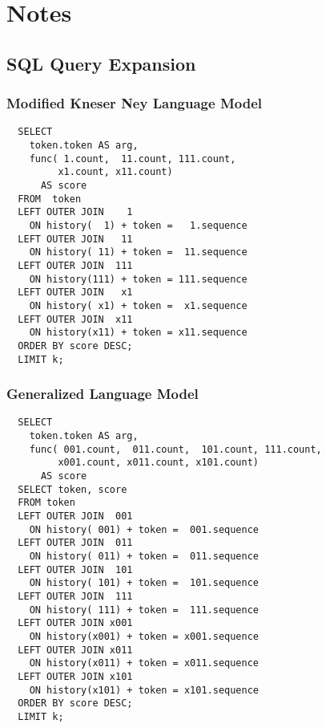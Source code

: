 \chapter{Notes}


\section{SQL Query Expansion}


\subsection{Modified Kneser Ney Language Model}

\begin{lstlisting}
  SELECT
    token.token AS arg,
    func( 1.count,  11.count, 111.count,
         x1.count, x11.count)
      AS score
  FROM  token
  LEFT OUTER JOIN    1
    ON history(  1) + token =   1.sequence
  LEFT OUTER JOIN   11
    ON history( 11) + token =  11.sequence
  LEFT OUTER JOIN  111
    ON history(111) + token = 111.sequence
  LEFT OUTER JOIN   x1
    ON history( x1) + token =  x1.sequence
  LEFT OUTER JOIN  x11
    ON history(x11) + token = x11.sequence
  ORDER BY score DESC;
  LIMIT k;
\end{lstlisting}

\clearpage
\subsection{Generalized Language Model}

\begin{lstlisting}
  SELECT
    token.token AS arg,
    func( 001.count,  011.count,  101.count, 111.count,
         x001.count, x011.count, x101.count)
      AS score
  SELECT token, score
  FROM token
  LEFT OUTER JOIN  001
    ON history( 001) + token =  001.sequence
  LEFT OUTER JOIN  011
    ON history( 011) + token =  011.sequence
  LEFT OUTER JOIN  101
    ON history( 101) + token =  101.sequence
  LEFT OUTER JOIN  111
    ON history( 111) + token =  111.sequence
  LEFT OUTER JOIN x001
    ON history(x001) + token = x001.sequence
  LEFT OUTER JOIN x011
    ON history(x011) + token = x011.sequence
  LEFT OUTER JOIN x101
    ON history(x101) + token = x101.sequence
  ORDER BY score DESC;
  LIMIT k;
\end{lstlisting}

